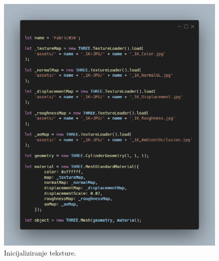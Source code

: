 \documentclass[a4paper,12pt]{article}
\begin{document}
\begin{figure}[ht]
    \centering
    \includegraphics[scale=0.5]{image/zadatak7.png}
    \caption{Inicijaliziranje teksture.}
\end{figure}
\end{document}

